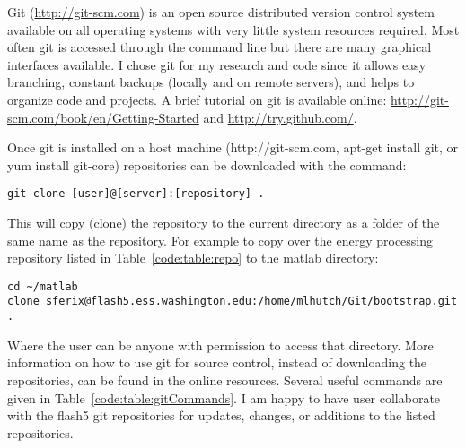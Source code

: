Git (\href{http://git-scm.com}{http://git-scm.com}) is an open source distributed version control system available on all operating systems with very little system resources required.
Most often git is accessed through the command line but there are many graphical interfaces available.
I chose git for my research and code since it allows easy branching, constant backups (locally and on remote servers), and helps to organize code and projects.
A brief tutorial on git is available online: \href{http://git-scm.com/book/en/Getting-Started}{http://git-scm.com/book/en/Getting-Started} and \href{http://try.github.com/}{http://try.github.com/}.

Once git is installed on a host machine (http://git-scm.com, apt-get install git, or yum install git-core) repositories can be downloaded with the command:

\begin{verbatim}
git clone [user]@[server]:[repository] .
\end{verbatim}

This will copy (clone) the repository to the current directory as a folder of the same name as the repository. 
For example to copy over the energy processing repository listed in Table~\ref{code:table:repo} to the matlab directory:

\begin{verbatim}
cd ~/matlab
clone sferix@flash5.ess.washington.edu:/home/mlhutch/Git/bootstrap.git .
\end{verbatim}

Where the user can be anyone with permission to access that directory.
More information on how to use git for source control, instead of downloading the repositories, can be found in the online resources.
Several useful commands are given in Table~\ref{code:table:gitCommands}.
I am happy to have user collaborate with the flash5 git repositories for updates, changes, or additions to the listed repositories.

